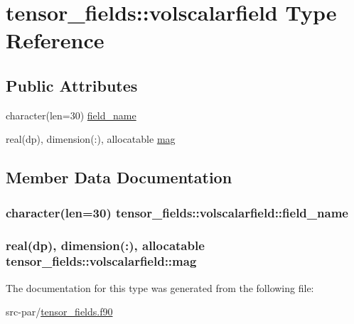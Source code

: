 \hypertarget{structtensor__fields_1_1volscalarfield}{\section{tensor\-\_\-fields\-:\-:volscalarfield Type Reference}
\label{structtensor__fields_1_1volscalarfield}
}
\subsection*{Public Attributes}
\begin{DoxyCompactItemize}
\item 
character(len=30) \hyperlink{structtensor__fields_1_1volscalarfield_a0497a26bd3ca8218b048539ef620f9f0}{field\-\_\-name}
\item 
real(dp), dimension(\-:), allocatable \hyperlink{structtensor__fields_1_1volscalarfield_a737ed84e07195495703b9c054c1f7c89}{mag}
\end{DoxyCompactItemize}


\subsection{Member Data Documentation}
\hypertarget{structtensor__fields_1_1volscalarfield_a0497a26bd3ca8218b048539ef620f9f0}{
\subsubsection[{field\-\_\-name}]{\setlength{\rightskip}{0pt plus 5cm}character(len=30) tensor\-\_\-fields\-::volscalarfield\-::field\-\_\-name}}\label{structtensor__fields_1_1volscalarfield_a0497a26bd3ca8218b048539ef620f9f0}
\hypertarget{structtensor__fields_1_1volscalarfield_a737ed84e07195495703b9c054c1f7c89}{
\subsubsection[{mag}]{\setlength{\rightskip}{0pt plus 5cm}real(dp), dimension(\-:), allocatable tensor\-\_\-fields\-::volscalarfield\-::mag}}\label{structtensor__fields_1_1volscalarfield_a737ed84e07195495703b9c054c1f7c89}


The documentation for this type was generated from the following file\-:\begin{DoxyCompactItemize}
\item 
src-\/par/\hyperlink{tensor__fields_8f90}{tensor\-\_\-fields.\-f90}\end{DoxyCompactItemize}
